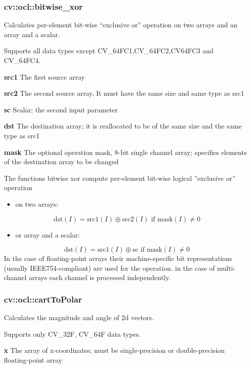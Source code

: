 \documentclass{article}
\begin{document}
\newpage

\subsubsection{cv::ocl::bitwise{\_}xor }
\label{subsubsec:mylabel9}
Calculates per-element bit-wise ``exclusive or'' operation on two arrays and
an array and a scalar.

Supports all data types except CV{\_}64FC1,CV{\_}64FC2,CV64FC3 and
CV{\_}64FC4.

\textbf{src1 }The first source array

\textbf{src2 }The second source array. It must have the same size and same
type as src1

\textbf{sc }Scalar; the second input parameter

\textbf{dst }The destination array; it is reallocated to be of the same size
and the same type as src1

\textbf{mask }The optional operation mask, 8-bit single channel array;
specifies elements of the destination array to be changed

The functions bitwise xor compute per-element bit-wise logical ''exclusive
or'' operation

\begin{itemize}
\item on two arrays:
\end{itemize}
\[
\mbox{dst}\left( I \right)=\mbox{src1}\left( I \right)\oplus
\mbox{src2}\left( I \right)\mbox{ if mask}\left( I \right)\ne 0
\]
\begin{itemize}
\item or array and a scalar:
\end{itemize}
\[
\mbox{dst}\left( I \right)=\mbox{src1}\left( I \right)\oplus \mbox{sc if
mask}\left( I \right)\ne 0
\]
In the case of floating-point arrays their machine-specific bit
representations (usually IEEE754-compliant) are used for the operation. in
the case of multi-channel arrays each channel is processed independently.

\newpage

\subsubsection{cv::ocl::cartToPolar }
\label{subsubsec:mylabel10}
Calculates the magnitude and angle of 2d vectors.

Supports only CV{\_}32F, CV{\_}64F data types.

\textbf{x }The array of x-coordinates; must be single-precision or
double-precision floating-point array
\end{document}
